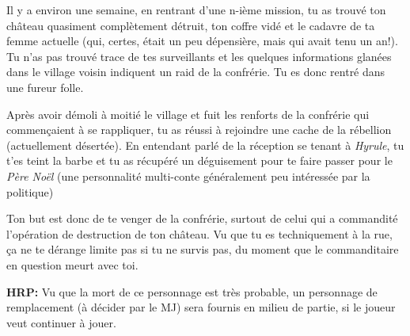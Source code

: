 {	\par Il y a environ une semaine, en rentrant d'une n-ième mission, tu as trouvé ton château quasiment complètement détruit, ton coffre vidé et le cadavre de ta femme actuelle (qui, certes, était un peu dépensière, mais qui avait tenu un an!). Tu n'as pas trouvé trace de tes surveillants et les quelques informations glanées dans le village voisin indiquent un raid de la confrérie. Tu es donc rentré dans une fureur folle.
	
	\par Après avoir démoli à moitié le village et fuit les renforts de la confrérie qui commençaient à se rappliquer, tu as réussi à rejoindre une cache de la rébellion (actuellement désertée). En entendant parlé de la réception se tenant à \emph{Hyrule}, tu t'es teint la barbe et tu as récupéré un déguisement pour te faire passer pour le \emph{Père Noël} (une personnalité multi-conte généralement peu intéressée par la politique)
	
	\par Ton but est donc de te venger de la confrérie, surtout de celui qui a commandité l'opération de destruction de ton château. Vu que tu es techniquement à la rue, ça ne te dérange limite pas si tu ne survis pas, du moment que le commanditaire en question meurt avec toi.
	
	\par \textbf{HRP:} Vu que la mort de ce personnage est très probable, un personnage de remplacement (à décider par le MJ) sera fournis en milieu de partie, si le joueur veut continuer à jouer.
}



